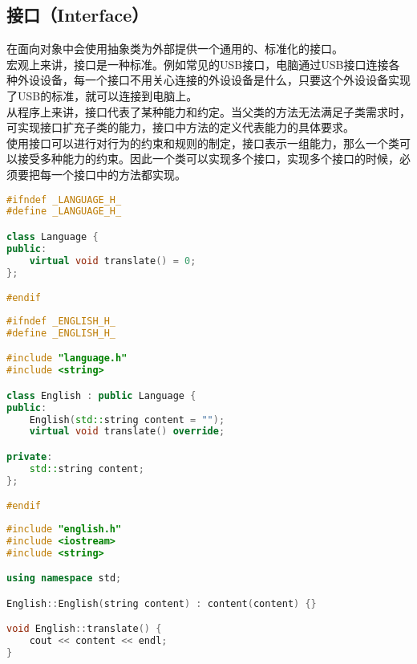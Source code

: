 \vspace{0.5cm}

\subsection{接口（Interface）}

在面向对象中会使用抽象类为外部提供一个通用的、标准化的接口。\\

宏观上来讲，接口是一种标准。例如常见的USB接口，电脑通过USB接口连接各种外设设备，每一个接口不用关心连接的外设设备是什么，只要这个外设设备实现了USB的标准，就可以连接到电脑上。\\

从程序上来讲，接口代表了某种能力和约定。当父类的方法无法满足子类需求时，可实现接口扩充子类的能力，接口中方法的定义代表能力的具体要求。\\

使用接口可以进行对行为的约束和规则的制定，接口表示一组能力，那么一个类可以接受多种能力的约束。因此一个类可以实现多个接口，实现多个接口的时候，必须要把每一个接口中的方法都实现。\\


\begin{lstlisting}[language=C++, title=language.h]
#ifndef _LANGUAGE_H_
#define _LANGUAGE_H_

class Language {
public:
	virtual void translate() = 0;
};

#endif
\end{lstlisting}

\begin{lstlisting}[language=C++, title=english.h]
#ifndef _ENGLISH_H_
#define _ENGLISH_H_

#include "language.h"
#include <string>

class English : public Language {
public:
	English(std::string content = "");
	virtual void translate() override;

private:
	std::string content;
};

#endif
\end{lstlisting}

\begin{lstlisting}[language=C++, title=english.cpp]
#include "english.h"
#include <iostream>
#include <string>

using namespace std;

English::English(string content) : content(content) {}

void English::translate() {
	cout << content << endl;
}
\end{lstlisting}

